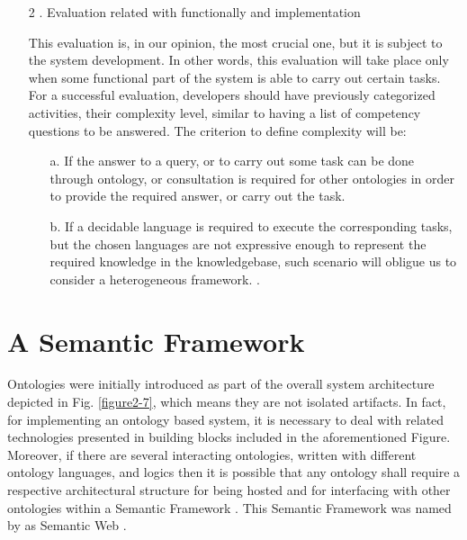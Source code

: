 \begin{enumerate}
\begin{enumerate}
	\end{enumerate}
	
	\item[2]. 	Evaluation related with functionally and implementation
	
	This evaluation is, in our opinion, the most crucial one, but it is subject to the system development. In other words, this evaluation will take place only when some functional part of the system is able to carry out certain tasks. For a successful evaluation, developers should have previously categorized activities, their complexity level, similar to having a list of competency questions to be answered. The criterion to define complexity will be:
	
	
	\begin{enumerate}
		
		\item[a.] If the answer to a query, or to carry out some task can  be done  through ontology, or consultation is required  for other ontologies in order to provide the required answer, or carry out the task.   
		
		\item[b.] If a decidable language is required to  execute  the corresponding tasks, but the chosen languages are not expressive enough to represent the required knowledge in the knowledgebase, such scenario will obligue us to consider a  heterogeneous framework. .  
		
	\end{enumerate}
	
\end{enumerate}


\section{A Semantic Framework}\label{section3.3}

Ontologies were initially introduced as part of the overall system architecture depicted in Fig. \ref{figure2-7}, which means they are not isolated artifacts. In fact, for implementing an ontology based system, it is necessary to deal with related technologies presented in building blocks included in the aforementioned Figure.  Moreover, if there are several interacting ontologies, written with different ontology languages, and logics then it is possible that any ontology shall require a respective architectural structure for being hosted and for interfacing with other ontologies within a Semantic Framework . This Semantic Framework was named by \cite{berners-lee_semantic_2001} as Semantic Web . 

